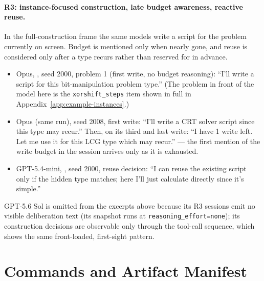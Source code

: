 \documentclass{article}
\begin{document}
\paragraph{R3: instance-focused construction, late budget awareness, reactive reuse.} In the full-construction frame the same models write a script for the problem currently on screen. Budget is mentioned only when nearly gone, and reuse is considered only after a type recurs rather than reserved for in advance.
\begin{itemize}
\item Opus, , seed 2000, problem 1 (first write, no budget reasoning): ``I'll write a script for this bit-manipulation problem type.'' (The problem in front of the model here is the \texttt{xorshift\_steps} item shown in full in Appendix~\ref{app:example-instances}.)
\item Opus (same run), seed 2008, first write: ``I'll write a CRT solver script since this type may recur.'' Then, on its third and last write: ``I have 1 write left. Let me use it for this LCG type which may recur.'' --- the first mention of the write budget in the session arrives only as it is exhausted.
\item GPT-5.4-mini, , seed 2000, reuse decision: ``I can reuse the existing script only if the hidden type matches; here I'll just calculate directly since it's simple.''
\end{itemize}

GPT-5.6 Sol is omitted from the excerpts above because its R3 sessions emit no visible deliberation text (its snapshot runs at \texttt{reasoning\_effort=none}); its construction decisions are observable only through the tool-call sequence, which shows the same front-loaded, first-sight pattern.

\section{Commands and Artifact Manifest} \label{app:manifest}
\end{document}
